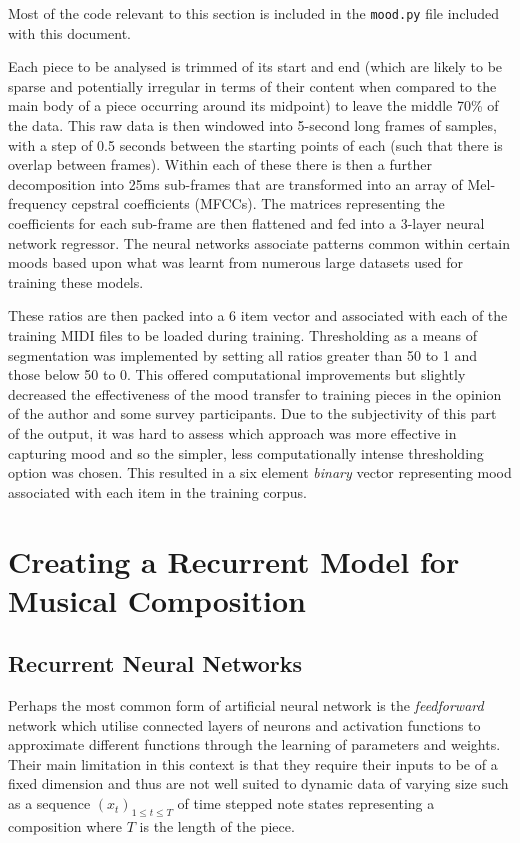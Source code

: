 \documentclass[12pt,]{article}
\begin{document}
Most of the code relevant to this section is included in the
\texttt{mood.py} file included with this document.

Each piece to be analysed is trimmed of its start and end (which are
likely to be sparse and potentially irregular in terms of their content
when compared to the main body of a piece occurring around its midpoint)
to leave the middle 70\% of the data. This raw data is then windowed
into 5-second long frames of samples, with a step of 0.5 seconds between
the starting points of each (such that there is overlap between frames).
Within each of these there is then a further decomposition into 25ms
sub-frames that are transformed into an array of Mel-frequency cepstral
coefficients (MFCCs). The matrices representing the coefficients for
each sub-frame are then flattened and fed into a 3-layer neural network
regressor. The neural networks associate patterns common within certain
moods based upon what was learnt from numerous large datasets used for
training these models.

These ratios are then packed into a 6 item vector and associated with
each of the training MIDI files to be loaded during training.
Thresholding as a means of segmentation was implemented by setting all
ratios greater than 50 to 1 and those below 50 to 0. This offered
computational improvements but slightly decreased the effectiveness of
the mood transfer to training pieces in the opinion of the author and
some survey participants. Due to the subjectivity of this part of the
output, it was hard to assess which approach was more effective in
capturing mood and so the simpler, less computationally intense
thresholding option was chosen. This resulted in a six element
\emph{binary} vector representing mood associated with each item in the
training corpus.

\hypertarget{creating-a-recurrent-model-for-musical-composition}{%
\section{Creating a Recurrent Model for Musical
Composition}\label{creating-a-recurrent-model-for-musical-composition}}

\hypertarget{recurrent-neural-networks}{%
\subsection{Recurrent Neural Networks}\label{recurrent-neural-networks}}

Perhaps the most common form of artificial neural network is the
\emph{feedforward} network which utilise connected layers of neurons and
activation functions to approximate different functions through the
learning of parameters and weights. Their main limitation in this
context is that they require their inputs to be of a fixed dimension and
thus are not well suited to dynamic data of varying size such as a
sequence \((x_t)_{1\le t\le T}\) of time stepped note states
representing a composition where \(T\) is the length of the piece.
\end{document}
